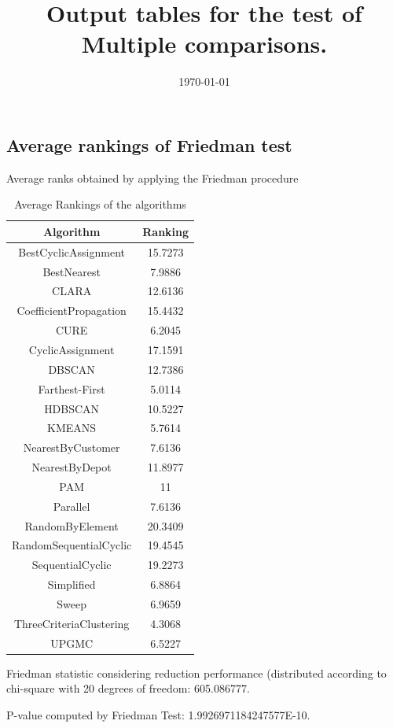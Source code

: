 \documentclass[a4paper,10pt]{article}
\title{Output tables for the test of Multiple comparisons.}
\author{}
\date{\today}
\begin{document}
\begin{landscape}
\pagestyle{empty}
\maketitle
\thispagestyle{empty}
\section{Average rankings of Friedman test}



Average ranks obtained by applying the Friedman procedure

\begin{table}[!htp]
\centering
\begin{tabular}{|c|c|}\hline
Algorithm&Ranking\\\hline
BestCyclicAssignment & 15.7273\\
BestNearest & 7.9886\\
CLARA & 12.6136\\
CoefficientPropagation & 15.4432\\
CURE & 6.2045\\
CyclicAssignment & 17.1591\\
DBSCAN & 12.7386\\
Farthest-First & 5.0114\\
HDBSCAN & 10.5227\\
KMEANS & 5.7614\\
NearestByCustomer & 7.6136\\
NearestByDepot & 11.8977\\
PAM & 11\\
Parallel & 7.6136\\
RandomByElement & 20.3409\\
RandomSequentialCyclic & 19.4545\\
SequentialCyclic & 19.2273\\
Simplified & 6.8864\\
Sweep & 6.9659\\
ThreeCriteriaClustering & 4.3068\\
UPGMC & 6.5227\\
\hline
\end{tabular}
\caption{Average Rankings of the algorithms}
\end{table}

Friedman statistic considering reduction performance (distributed according to chi-square with 20 degrees of freedom: 605.086777.

P-value computed by Friedman Test: 1.9926971184247577E-10.\newline


\end{landscape}
\end{document}
